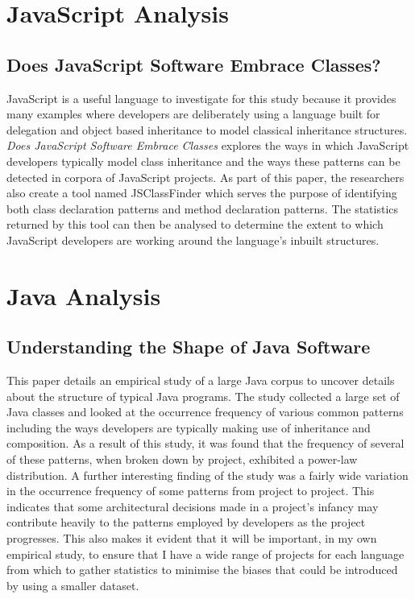 \section{JavaScript Analysis}
\subsection{Does JavaScript Software Embrace Classes?~\cite{JSClassFinder}}
JavaScript is a useful language to investigate for this study because it provides many examples where developers are deliberately using a language built for delegation and object based inheritance to model classical inheritance structures. \textit{Does JavaScript Software Embrace Classes} explores the ways in which JavaScript developers typically model class inheritance and the ways these patterns can be detected in corpora of JavaScript projects. As part of this paper, the researchers also create a tool named JSClassFinder which serves the purpose of identifying both class declaration patterns and method declaration patterns. The statistics returned by this tool can then be analysed to determine the extent to which JavaScript developers are working around the language's inbuilt structures.

\section{Java Analysis}
\subsection{Understanding the Shape of Java Software~\cite{ShapeOfJava}}
This paper details an empirical study of a large Java corpus to uncover details about the structure of typical Java programs. The study collected a large set of Java classes and looked at the occurrence frequency of various common patterns including the ways developers are typically making use of inheritance and composition. As a result of this study, it was found that the frequency of several of these patterns, when broken down by project, exhibited a power-law distribution. \newline
A further interesting finding of the study was a fairly wide variation in the occurrence frequency of some patterns from project to project. This indicates that some architectural decisions made in a project's infancy may contribute heavily to the patterns employed by developers as the project progresses. This also makes it evident that it will be important, in my own empirical study, to ensure that I have a wide range of projects for each language from which to gather statistics to minimise the biases that could be introduced by using a smaller dataset.


